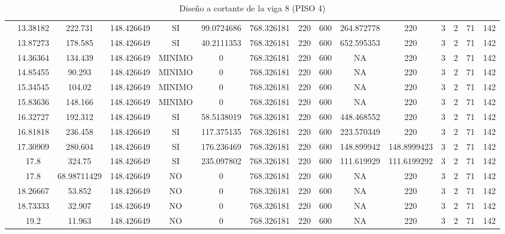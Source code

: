 \begin{table}[H]
{\begin{tabular}{|c|c|c|c|c|c|c|c|c|c|c|c|c|c|c|}
\cline{2-15}    & 13.38182 & 222.731 & 148.426649 & SI  & 99.0724686 & 768.326181 & 220 & 600 & 264.872778 & 220 & 3   & 2   & 71  & 142 \bigstrut\\
\cline{2-15}    & 13.87273 & 178.585 & 148.426649 & SI  & 40.2111353 & 768.326181 & 220 & 600 & 652.595353 & 220 & 3   & 2   & 71  & 142 \bigstrut\\
\cline{2-15}    & 14.36364 & 134.439 & 148.426649 & MINIMO & 0   & 768.326181 & 220 & 600 & NA  & 220 & 3   & 2   & 71  & 142 \bigstrut\\
\cline{2-15}    & 14.85455 & 90.293 & 148.426649 & MINIMO & 0   & 768.326181 & 220 & 600 & NA  & 220 & 3   & 2   & 71  & 142 \bigstrut\\
\cline{2-15}    & 15.34545 & 104.02 & 148.426649 & MINIMO & 0   & 768.326181 & 220 & 600 & NA  & 220 & 3   & 2   & 71  & 142 \bigstrut\\
\cline{2-15}    & 15.83636 & 148.166 & 148.426649 & MINIMO & 0   & 768.326181 & 220 & 600 & NA  & 220 & 3   & 2   & 71  & 142 \bigstrut\\
\cline{2-15}    & 16.32727 & 192.312 & 148.426649 & SI  & 58.5138019 & 768.326181 & 220 & 600 & 448.468552 & 220 & 3   & 2   & 71  & 142 \bigstrut\\
\cline{2-15}    & 16.81818 & 236.458 & 148.426649 & SI  & 117.375135 & 768.326181 & 220 & 600 & 223.570349 & 220 & 3   & 2   & 71  & 142 \bigstrut\\
\cline{2-15}    & 17.30909 & 280.604 & 148.426649 & SI  & 176.236469 & 768.326181 & 220 & 600 & 148.899942 & 148.8999423 & 3   & 2   & 71  & 142 \bigstrut\\
\cline{2-15}    & 17.8 & 324.75 & 148.426649 & SI  & 235.097802 & 768.326181 & 220 & 600 & 111.619929 & 111.6199292 & 3   & 2   & 71  & 142 \bigstrut\\
\cline{2-15}    & 17.8 & 68.98711429 & 148.426649 & NO  & 0   & 768.326181 & 220 & 600 & NA  & 220 & 3   & 2   & 71  & 142 \bigstrut\\
\cline{2-15}    & 18.26667 & 53.852 & 148.426649 & NO  & 0   & 768.326181 & 220 & 600 & NA  & 220 & 3   & 2   & 71  & 142 \bigstrut\\
\cline{2-15}    & 18.73333 & 32.907 & 148.426649 & NO  & 0   & 768.326181 & 220 & 600 & NA  & 220 & 3   & 2   & 71  & 142 \bigstrut\\
\cline{2-15}    & 19.2 & 11.963 & 148.426649 & NO  & 0   & 768.326181 & 220 & 600 & NA  & 220 & 3   & 2   & 71  & 142 \bigstrut\\
\hline
\end{tabular}%

  
 
  }%
    \caption{Diseño a cortante de la viga 8 (PISO 4) }
  \label{tab:C VG8 P4 }%
\end{table}%
